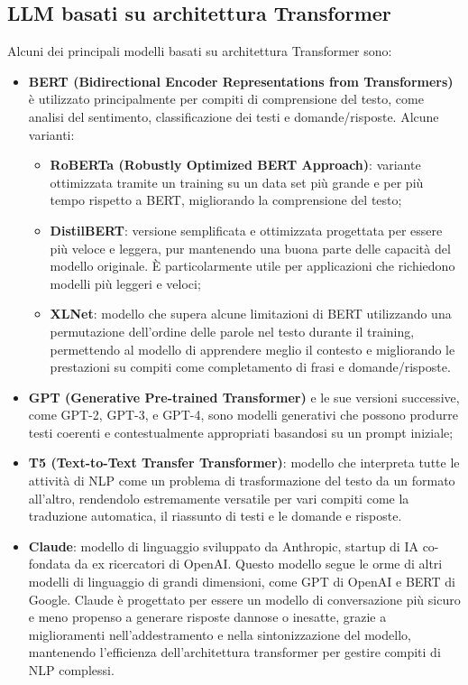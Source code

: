     \subsection{LLM basati su architettura Transformer}
        Alcuni dei principali modelli basati su architettura Transformer sono: 
        \begin{itemize}
            \item \textbf{BERT (Bidirectional Encoder Representations from Transformers)} è utilizzato principalmente per compiti di comprensione del testo, come analisi del sentimento, classificazione dei testi e domande/risposte. Alcune varianti:  
            \begin{itemize}
                \item \textbf{RoBERTa (Robustly Optimized BERT Approach)}: variante ottimizzata tramite un training su un data set più grande e per più tempo rispetto a BERT, migliorando la comprensione del testo; 
                
               \item \textbf{ DistilBERT}: versione semplificata e ottimizzata progettata per essere più veloce e leggera, pur mantenendo una buona parte delle capacità del modello originale. È particolarmente utile per applicazioni che richiedono modelli più leggeri e veloci;  
                
                \item \textbf{XLNet}: modello che supera alcune limitazioni di BERT utilizzando una permutazione dell'ordine delle parole nel testo durante il training, permettendo al modello di apprendere meglio il contesto e migliorando le prestazioni su compiti come completamento di frasi e domande/risposte.   
            \end{itemize}
            
            \item \textbf{GPT (Generative Pre-trained Transformer)} e le sue versioni successive, come GPT-2, GPT-3, e GPT-4, sono modelli generativi che possono produrre testi coerenti e contestualmente appropriati basandosi su un prompt iniziale;   
            
            \item \textbf{T5 (Text-to-Text Transfer Transformer)}: modello che interpreta tutte le attività di NLP come un problema di trasformazione del testo da un formato all'altro, rendendolo estremamente versatile per vari compiti come la traduzione automatica, il riassunto di testi e le domande e risposte. 
            
            \item \textbf{Claude}: modello di linguaggio sviluppato da Anthropic, startup di IA co-fondata da ex ricercatori di OpenAI. Questo modello segue le orme di altri modelli di linguaggio di grandi dimensioni, come GPT di OpenAI e BERT di Google. Claude è progettato per essere un modello di conversazione più sicuro e meno propenso a generare risposte dannose o inesatte, grazie a miglioramenti nell'addestramento e nella sintonizzazione del modello, mantenendo l'efficienza dell'architettura transformer per gestire compiti di NLP complessi. 
        \end{itemize}
        
